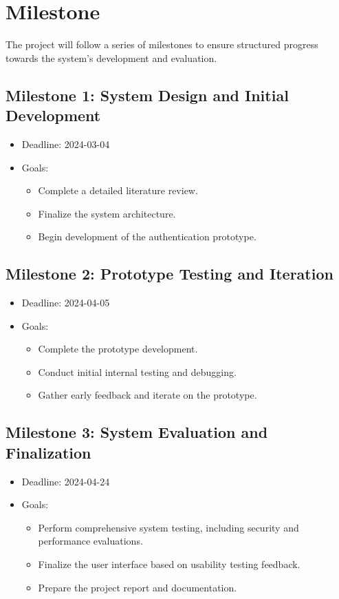 \section{Milestone}

The project will follow a series of milestones to ensure structured progress towards the system's development and evaluation.

\subsection{Milestone 1: System Design and Initial Development}

\begin{itemize}
    \item Deadline: 2024-03-04
    \item Goals: 
    \begin{itemize}
        \item Complete a detailed literature review.
        \item Finalize the system architecture.
        \item Begin development of the authentication prototype.
    \end{itemize}
\end{itemize}

\subsection{Milestone 2: Prototype Testing and Iteration}

\begin{itemize}
    \item Deadline: 2024-04-05
    \item Goals: 
    \begin{itemize}
        \item Complete the prototype development.
        \item Conduct initial internal testing and debugging.
        \item Gather early feedback and iterate on the prototype.
    \end{itemize}
\end{itemize}

\subsection{Milestone 3: System Evaluation and Finalization}

\begin{itemize}
    \item Deadline: 2024-04-24
    \item Goals: 
    \begin{itemize}
        \item Perform comprehensive system testing, including security and performance evaluations.
        \item Finalize the user interface based on usability testing feedback.
        \item Prepare the project report and documentation.
    \end{itemize}
\end{itemize}
